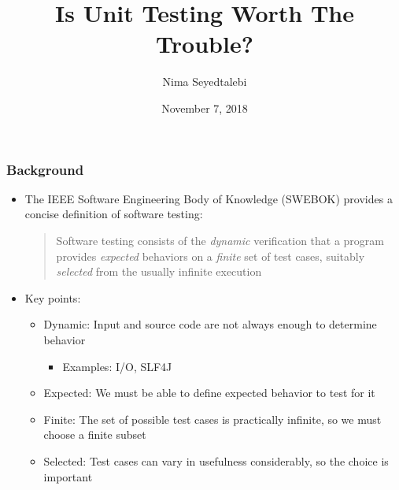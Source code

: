 \documentclass{beamer}
\begin{document}
\author{Nima Seyedtalebi}
\title{Is Unit Testing Worth The Trouble?}
\date{November 7, 2018}

\begin{frame}[plain]
\maketitle
\end{frame}

\begin{frame}
\frametitle{Background}
\begin{itemize}
	\item The IEEE Software Engineering Body of Knowledge (SWEBOK) provides a concise definition of software testing:
	
		\blockcquote{SWEBOK}{Software testing consists of the \textit{dynamic} verification that a program provides \textit{expected} behaviors on a \textit{finite} set of test cases, suitably \textit{selected} from the usually infinite execution}
 	\item Key points:
	\begin{itemize}
 		\item Dynamic: Input and source code are not always enough to determine behavior
 		\begin{itemize}
 			\item Examples: I/O, SLF4J
 		\end{itemize}
		\item Expected: We must be able to define expected behavior to test for it
 		\item Finite: The set of possible test cases is practically infinite, so we must choose a finite subset
 		\item Selected: Test cases can vary in usefulness considerably, so the choice is important
	\end{itemize}
\end{itemize}
\end{frame}
\end{document}
